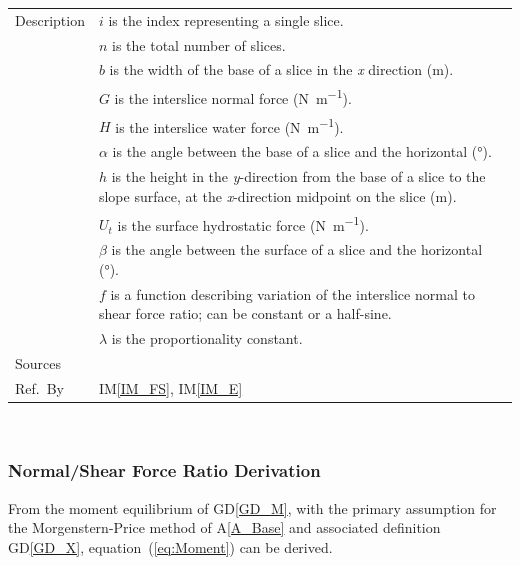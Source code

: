 \documentclass[12pt]{article}
\newcommand{\colAwidth}{0.13\textwidth}
\newcommand{\colBwidth}{0.82\textwidth}
\newcommand{\aref}[1]{A\ref{#1}}
\newcommand{\iref}[1]{IM\ref{#1}}
\newcommand{\dref}[1]{GD\ref{#1}}
\begin{document}
\begin{minipage}{\textwidth}
\begin{tabular}{| p{\colAwidth} | p{\colBwidth} |}
\hline Description & $i$ is the index representing a single slice.\\
&$n$ is the total number of slices.\\
&$b$ is the width of the base of a slice in the \textit{x} direction 
(\si{\meter}).\\
&$G$ is the interslice normal force (\si{\newton\per\meter}).\\
&$H$ is the interslice water force (\si{\newton\per\meter}). \\
&$\alpha$ is the angle between the base of a slice and the 
horizontal (\si{\degree}). \\
&$h$ is the height in the \textit{y}-direction from the base of a slice 
to the slope surface, at the \textit{x}-direction midpoint on the slice 
(\si{\meter}).\\
&$U_t$ is the surface hydrostatic force (\si{\newton\per\meter}).\\
&$\beta$ is the angle between the surface of a slice and the 
horizontal (\si{\degree}). \\
&$f$ is a function describing variation of the interslice normal to shear 
force ratio; can be constant or a half-sine. \\
&$\lambda$ is the proportionality constant.\\

\hline Sources& \cite{ZhuEtAl2005}\\

\hline Ref.\ By & \iref{IM_FS}, \iref{IM_E} \\

\hline
\end{tabular}
\end{minipage}\\


\subsubsection*{Normal/Shear Force Ratio Derivation}

 From the moment equilibrium of \dref{GD_M}, with the primary assumption for 
 the Morgenstern-Price method of \aref{A_Base} and associated definition 
 \dref{GD_X}, equation~(\ref{eq:Moment}) can be derived.
\end{document}
